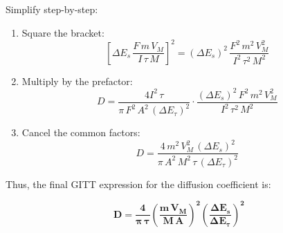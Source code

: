\documentclass{article}
\begin{document}
Simplify step-by-step:
\begin{enumerate}[label=(\roman*)]
    \item Square the bracket:
    \begin{equation}\label{eq:con:17}
    \left[\Delta E_s\,\frac{F\,m\,V_M}{I\,\tau\,M}\right]^2 = (\Delta E_s)^2\,\frac{F^2\,m^2\,V_M^2}{I^2\,\tau^2\,M^2}\,
    \end{equation}
    \item Multiply by the prefactor:
    \begin{equation}\label{eq:con:18}
    D = \frac{4I^2\,\tau}{\pi\,F^2\,A^2\,(\Delta E_\tau)^2} \cdot \frac{(\Delta E_s)^2\,F^2\,m^2\,V_M^2}{I^2\,\tau^2\,M^2}\,
    \end{equation}
    \item Cancel the common factors:
    \begin{equation}\label{eq:con:19}
    D = \frac{4\,m^2\,V_M^2\,(\Delta E_s)^2}{\pi\,A^2\,M^2\,\tau\,(\Delta E_\tau)^2}\,
    \end{equation}
\end{enumerate}
Thus, the final GITT expression for the diffusion coefficient is:

\begin{equation}\label{eq:con:20}
\bm{D = \frac{4}{\pi\,\tau}\left(\frac{m\,V_M}{M\,A}\right)^2\left(\frac{\Delta E_s}{\Delta E_\tau}\right)^2}\,
\end{equation}
\newpage


\end{document}
